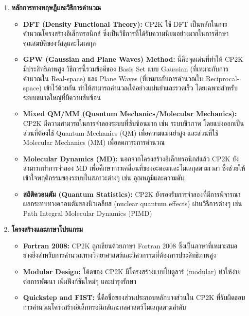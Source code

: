 \begin{enumerate}[topsep=0pt,noitemsep]
    \setlength\itemsep{0.5em}
    \item \textbf{หลักการทางทฤษฎีและวิธีการคำนวณ}
    \begin{itemize}
        \item \textbf{DFT (Density Functional Theory):} CP2K ใช้ DFT เป็นหลักในการคำนวณโครงสร้างอิเล็กทรอนิกส์ ซึ่งเป็นวิธีการที่ได้รับความนิยมอย่างมากในการศึกษาคุณสมบัติของวัสดุและโมเลกุล
        \item \textbf{GPW (Gaussian and Plane Waves) Method:} นี่คือจุดเด่นที่ทำให้ CP2K มีประสิทธิภาพสูง วิธีการนี้รวมข้อดีของ Basis Set แบบ Gaussian (ที่เหมาะกับการคำนวณใน Real-space) และ Plane Waves (ที่เหมาะกับการคำนวณใน Reciprocal-space) เข้าไว้ด้วยกัน ทำให้สามารถคำนวณได้อย่างแม่นยำและรวดเร็ว โดยเฉพาะสำหรับระบบขนาดใหญ่ที่มีความซับซ้อน
        \item \textbf{Mixed QM/MM (Quantum Mechanics/Molecular Mechanics):} CP2K มีความสามารถในการจำลองระบบที่ซับซ้อนมาก เช่น ระบบชีวภาพ โดยแบ่งออกเป็นส่วนที่ต้องใช้ Quantum Mechanics (QM) เพื่อความแม่นยำสูง และส่วนที่ใช้ Molecular Mechanics (MM) เพื่อลดภาระการคำนวณ
        \item \textbf{Molecular Dynamics (MD):} นอกจากโครงสร้างอิเล็กทรอนิกส์แล้ว CP2K ยังสามารถทำการจำลอง MD เพื่อศึกษาการเคลื่อนที่ของอะตอมและโมเลกุลตามเวลา ซึ่งช่วยให้เข้าใจพฤติกรรมของระบบในสภาวะต่างๆ เช่น อุณหภูมิและความดัน
        \item \textbf{สถิติควอนตัม (Quantum Statistics):} CP2K ยังรองรับการจำลองที่มีการพิจารณาผลกระทบทางควอนตัมของนิวเคลียส (nuclear quantum effects) ผ่านวิธีการต่างๆ เช่น Path Integral Molecular Dynamics (PIMD)
    \end{itemize}

    \item \textbf{โครงสร้างและภาษาโปรแกรม}
    \begin{itemize}
        \item \textbf{Fortran 2008:} CP2K ถูกเขียนด้วยภาษา Fortran 2008 ซึ่งเป็นภาษาที่เหมาะสมอย่างยิ่งสำหรับการคำนวณทางวิทยาศาสตร์และวิศวกรรมที่ต้องการประสิทธิภาพสูง
        \item \textbf{Modular Design:} โค้ดของ CP2K มีโครงสร้างแบบโมดูลาร์ (modular) ทำให้ง่ายต่อการพัฒนา เพิ่มฟังก์ชันใหม่ๆ และบำรุงรักษา
        \item \textbf{Quickstep and FIST:} นี่คือชื่อของส่วนประกอบหลักบางส่วนใน CP2K ที่รับผิดชอบการคำนวณโครงสร้างอิเล็กทรอนิกส์และกลศาสตร์โมเลกุลตามลำดับ
    \end{itemize}


\end{enumerate}
